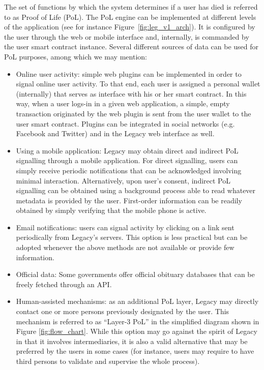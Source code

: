 The set of functions by which the system determines if a user has died is referred to as Proof of Life (PoL). The PoL engine can be implemented at different levels of the application (see for instance Figure~\ref{fig:leg_v1_arch}). It is configured by the user through the web or mobile interface and, internally, is commanded by the user smart contract instance. Several different sources of data can be used for PoL purposes, among which we may mention:
\begin{itemize}
	\item Online user activity: simple web plugins can be implemented in order to signal online user activity. To that end, each user is assigned a personal wallet (internally) that serves as interface with his or her smart contract. In this way, when a user logs-in in a given web application, a simple, empty transaction originated by the web plugin is sent from the user wallet to the user smart contract. Plugins can be integrated in social networks (e.g. Facebook and Twitter) and in the Legacy web interface as well.
	\item Using a mobile application: Legacy may obtain direct and indirect PoL signalling through a mobile application. For direct signalling, users can simply receive periodic notifications that can be acknowledged involving minimal interaction. Alternatively, upon user's consent, indirect PoL signalling can be obtained using a background process able to read whatever metadata is provided by the user. First-order information can be readily obtained by simply verifying that the mobile phone is active.
	\item Email notifications: users can signal activity by clicking on a link sent periodically from Legacy’s servers. This option is less practical but can be adopted whenever the above methods are not available or provide few information.
	\item Official data: Some governments offer official obituary databases that can be freely fetched through an API.  
	\item Human-assisted mechanisms: as an additional PoL layer, Legacy may directly contact one or more persons previously designated by the user. This mechanism is referred to as ``Layer-3 PoL'' in the simplified diagram shown in Figure \ref{fig:flow_chart}. While this option may go against the spirit of Legacy in that it involves intermediaries, it is also a valid alternative that may be preferred by the users in some cases (for instance, users may require to have third persons to validate and supervise the whole process).
\end{itemize}

